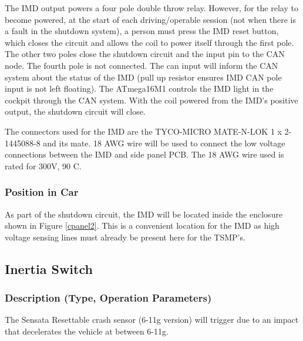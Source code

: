 \documentclass{article}
\begin{document}
            The IMD output powers a four pole double throw relay. However, for the relay to become powered, at the start of each driving/operable session (not when there is a fault in the shutdown system), a person must press the IMD reset button, which closes the circuit and allows the coil to power itself through the first pole. The other two poles close the shutdown circuit and the input pin to the CAN node. The fourth pole is not connected. The can input will inform the CAN system about the status of the IMD (pull up resistor ensures IMD CAN pole input is not left floating). The ATmega16M1 controls the IMD light in the cockpit through the CAN system. With the coil powered from the IMD's positive output, the shutdown circuit will close.

            The connectors used for the IMD are the TYCO-MICRO MATE-N-LOK 1 x 2-1445088-8 and its mate. 18 AWG wire will be used to connect the low voltage connections between the IMD and side panel PCB. The 18 AWG wire used is rated for 300V, 90 \degree C.


        \subsubsection{Position in Car}

            As part of the shutdown circuit, the IMD will be located inside the enclosure shown in Figure \ref{cpanel2}. This is a convenient location for the IMD as high voltage sensing lines must already be present here for the TSMP's.

    \subsection{Inertia Switch}

        \subsubsection{Description (Type, Operation Parameters)}

            The Sensata Resettable crash sensor (6-11g version) will trigger due to an impact that decelerates the vehicle at between 6-11g.
\end{document}
